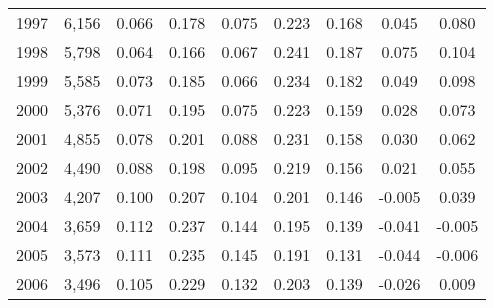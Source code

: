 \begin{tabular}{l c c c c c c c c}
1997&6,156&0.066&0.178&0.075&0.223&0.168&0.045&0.080\\
1998&5,798&0.064&0.166&0.067&0.241&0.187&0.075&0.104\\
1999&5,585&0.073&0.185&0.066&0.234&0.182&0.049&0.098\\
2000&5,376&0.071&0.195&0.075&0.223&0.159&0.028&0.073\\
2001&4,855&0.078&0.201&0.088&0.231&0.158&0.030&0.062\\
2002&4,490&0.088&0.198&0.095&0.219&0.156&0.021&0.055\\
2003&4,207&0.100&0.207&0.104&0.201&0.146&-0.005&0.039\\
2004&3,659&0.112&0.237&0.144&0.195&0.139&-0.041&-0.005\\
2005&3,573&0.111&0.235&0.145&0.191&0.131&-0.044&-0.006\\
2006&3,496&0.105&0.229&0.132&0.203&0.139&-0.026&0.009\\
\bottomrule
\end{tabular}
